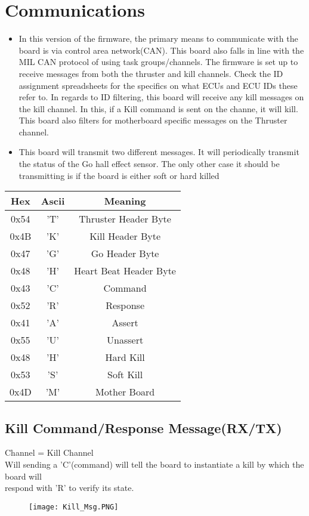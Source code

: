 \documentclass[a4paper,12pt,oneside,pdflatex,italian,final,twocolumn]{article}
\begin{document}
\section{Communications}
\begin{itemize}
\item In this version of the firmware, the primary means to communicate with the board is via control area network(CAN). This board also falls in line with the MIL CAN protocol of using task groups/channels. The firmware is set up to receive messages from both the thruster and kill channels. Check the ID assignment spreadsheets for the specifics on what ECUs and ECU IDs these refer to. In regards to ID filtering, this board will receive any kill messages on the kill channel. In this, if a Kill command is sent on the channe, it will kill. This board also filters for motherboard specific messages on the Thruster channel. \\
\vspace{-1cm}
\item This board will transmit two different messages. It will periodically transmit the status of the Go hall effect sensor. The only other case it should be transmitting is if the board is either soft or hard killed \\
\end{itemize}

\vspace{-20cm}
\centering
\begin{tabular}{c|c|c}
\toprule
Hex & Ascii & Meaning \\             
\midrule
0x54 & 'T' &  Thruster Header Byte\\
0x4B & 'K' &  Kill Header Byte\\
0x47 & 'G'&   Go Header Byte\\
0x48 & 'H' &  Heart Beat Header Byte\\
0x43 & 'C' &  Command\\
0x52 & 'R' &  Response\\ 
0x41 & 'A' &  Assert\\
0x55 & 'U' &  Unassert\\
0x48 & 'H' &  Hard Kill\\
0x53 & 'S' &  Soft Kill\\
0x4D & 'M' &  Mother Board\\
\bottomrule
\end{tabular}



\pagebreak
\raggedright
\subsection{Kill Command/Response Message(RX/TX)}
Channel = Kill Channel\\ 
Will sending a 'C'(command) will tell the board to instantiate a kill by which the board will\\respond with 'R' to verify its state. 
\centering
\begin{figure}[h]
\centering
\texttt{[image: Kill\_Msg.PNG]}
\end{figure}
\end{document}
